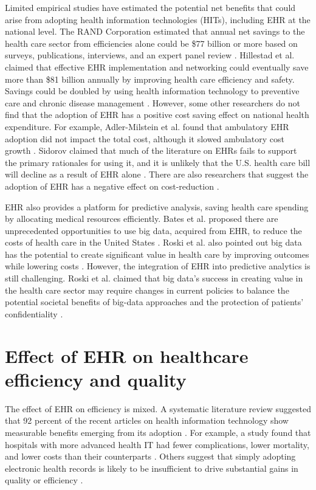 \documentclass[12pt]{report}
\begin{document}
Limited empirical studies have estimated the potential net benefits that could arise from adopting health information technologies (HITs), including EHR at the national level. The RAND Corporation estimated that annual net savings to the health care sector from efficiencies alone could be \$77 billion or more based on surveys, publications, interviews, and an expert panel review \citep{Rand2005}. Hillestad et al. claimed that effective EHR implementation and networking could eventually save more than \$81 billion annually by improving health care efficiency and safety. Savings could be doubled by using health information technology to preventive care and chronic disease management \citep{Hillestad2005}. However, some other researchers do not find that the adoption of EHR has a positive cost saving effect on national health expenditure. For example, Adler-Milstein et al. found that ambulatory EHR adoption did not impact the total cost, although it slowed ambulatory cost growth \citep{Adler-Milstein2013}. Sidorov claimed that much of the literature on EHRs fails to support the primary rationales for using it, and it is unlikely that the U.S. health care bill will decline as a result of EHR alone \citep{Sidorov2006}. There are also researchers that suggest the adoption of EHR has a negative effect on cost-reduction  \citep{Teufel2012}.

EHR also provides a platform for predictive analysis, saving health care spending by allocating medical resources efficiently. Bates et al. proposed there are unprecedented opportunities to use big data, acquired from EHR, to reduce the costs of health care in the United States \citep{Bates2014}. Roski et al. also pointed out big data has the potential to create significant value in health care by improving outcomes while lowering costs \citep{Roski2014}. However, the integration of EHR into predictive analytics is still challenging. Roski et al. claimed that big data's success in creating value in the health care sector may require changes in current policies to balance the potential societal benefits of big-data approaches and the protection of patients' confidentiality \citep{Roski2014}.

\section{Effect of EHR on healthcare efficiency and quality}

The effect of EHR on efficiency is mixed. A systematic literature review suggested that 92 percent of the recent articles on health information technology show measurable benefits emerging from its adoption \citep{Buntin2011}. For example, a study found that hospitals with more advanced health IT had fewer complications, lower mortality, and lower costs than their counterparts \citep{amarasingham2009clinical}. Others suggest that simply adopting electronic health records is likely to be insufficient to drive substantial gains in quality or efficiency \citep{DesRoches2010}. 
\end{document}
